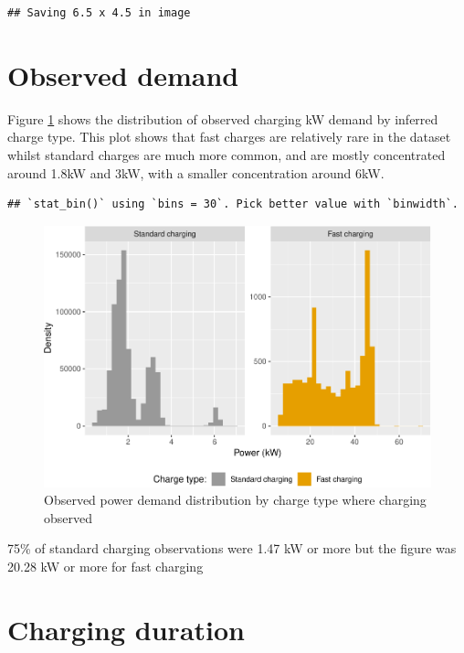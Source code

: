 \documentclass[]{article}
\begin{document}
\begin{verbatim}
## Saving 6.5 x 4.5 in image
\end{verbatim}

\section{Observed demand}\label{observed-demand}

Figure \ref{fig:obsPower} shows the distribution of observed charging kW
demand by inferred charge type. This plot shows that fast charges are
relatively rare in the dataset whilst standard charges are much more
common, and are mostly concentrated around 1.8kW and 3kW, with a smaller
concentration around 6kW.

\begin{verbatim}
## `stat_bin()` using `bins = 30`. Pick better value with `binwidth`.
\end{verbatim}

\begin{figure}
\centering
\includegraphics{EVBB_report_files/figure-latex/obsPower-1.pdf}
\caption{\label{fig:obsPower}Observed power demand distribution by charge
type where charging observed}
\end{figure}

75\% of standard charging observations were 1.47 kW or more but the
figure was 20.28 kW or more for fast charging

\section{Charging duration}\label{duration}
\end{document}
